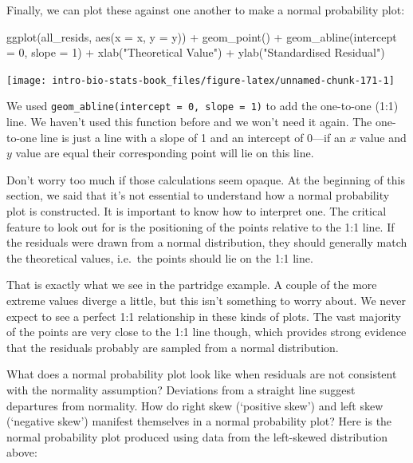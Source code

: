 \documentclass[
]{book}
\newenvironment{Shaded}{\begin{snugshade}}{\end{snugshade}}
\newcommand{\AttributeTok}[1]{\textcolor[rgb]{0.77,0.63,0.00}{#1}}
\newcommand{\DecValTok}[1]{\textcolor[rgb]{0.00,0.00,0.81}{#1}}
\newcommand{\FunctionTok}[1]{\textcolor[rgb]{0.00,0.00,0.00}{#1}}
\newcommand{\NormalTok}[1]{#1}
\newcommand{\SpecialCharTok}[1]{\textcolor[rgb]{0.00,0.00,0.00}{#1}}
\newcommand{\StringTok}[1]{\textcolor[rgb]{0.31,0.60,0.02}{#1}}
\begin{document}
Finally, we can plot these against one another to make a normal probability plot:

\begin{Shaded}
\begin{Highlighting}[]
\FunctionTok{ggplot}\NormalTok{(all\_resids, }\FunctionTok{aes}\NormalTok{(}\AttributeTok{x =}\NormalTok{ x, }\AttributeTok{y =}\NormalTok{ y)) }\SpecialCharTok{+} 
  \FunctionTok{geom\_point}\NormalTok{() }\SpecialCharTok{+} \FunctionTok{geom\_abline}\NormalTok{(}\AttributeTok{intercept =} \DecValTok{0}\NormalTok{, }\AttributeTok{slope =} \DecValTok{1}\NormalTok{) }\SpecialCharTok{+}
  \FunctionTok{xlab}\NormalTok{(}\StringTok{"Theoretical Value"}\NormalTok{) }\SpecialCharTok{+} \FunctionTok{ylab}\NormalTok{(}\StringTok{"Standardised Residual"}\NormalTok{)}
\end{Highlighting}
\end{Shaded}

\begin{center}\texttt{[image: intro-bio-stats-book\_files/figure-latex/unnamed-chunk-171-1]} \end{center}

We used \texttt{geom\_abline(intercept\ =\ 0,\ slope\ =\ 1)} to add the one-to-one (1:1) line. We haven't used this function before and we won't need it again. The one-to-one line is just a line with a slope of 1 and an intercept of 0---if an \(x\) value and \(y\) value are equal their corresponding point will lie on this line.

Don't worry too much if those calculations seem opaque. At the beginning of this section, we said that it's not essential to understand how a normal probability plot is constructed. It is important to know how to interpret one. The critical feature to look out for is the positioning of the points relative to the 1:1 line. If the residuals were drawn from a normal distribution, they should generally match the theoretical values, i.e.~the points should lie on the 1:1 line.

That is exactly what we see in the partridge example. A couple of the more extreme values diverge a little, but this isn't something to worry about. We never expect to see a perfect 1:1 relationship in these kinds of plots. The vast majority of the points are very close to the 1:1 line though, which provides strong evidence that the residuals probably are sampled from a normal distribution.

What does a normal probability plot look like when residuals are not consistent with the normality assumption? Deviations from a straight line suggest departures from normality. How do right skew (`positive skew') and left skew (`negative skew') manifest themselves in a normal probability plot? Here is the normal probability plot produced using data from the left-skewed distribution above:
\end{document}
